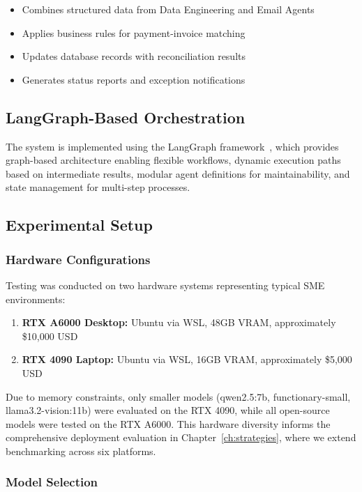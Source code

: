\begin{itemize}[leftmargin=*]
    \item Combines structured data from Data Engineering and Email Agents
    \item Applies business rules for payment-invoice matching
    \item Updates database records with reconciliation results
    \item Generates status reports and exception notifications
\end{itemize}

\subsection{LangGraph-Based Orchestration}

The system is implemented using the LangGraph framework~\cite{langchain2024langgraph}, which provides graph-based architecture enabling flexible workflows, dynamic execution paths based on intermediate results, modular agent definitions for maintainability, and state management for multi-step processes.

\subsection{Experimental Setup}

\subsubsection{Hardware Configurations}

Testing was conducted on two hardware systems representing typical SME environments:

\begin{enumerate}[leftmargin=*]
    \item \textbf{RTX A6000 Desktop:} Ubuntu via WSL, 48GB VRAM, approximately \$10,000 USD
    \item \textbf{RTX 4090 Laptop:} Ubuntu via WSL, 16GB VRAM, approximately \$5,000 USD
\end{enumerate}

Due to memory constraints, only smaller models (qwen2.5:7b, functionary-small, llama3.2-vision:11b) were evaluated on the RTX 4090, while all open-source models were tested on the RTX A6000. This hardware diversity informs the comprehensive deployment evaluation in Chapter~\ref{ch:strategies}, where we extend benchmarking across six platforms.

\subsubsection{Model Selection}

